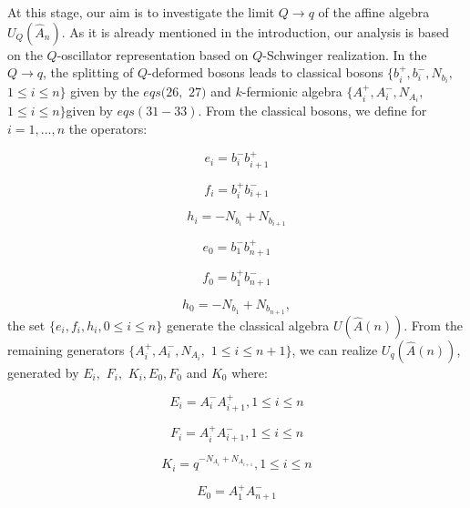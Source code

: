 \documentclass[a4paper,12pt,thmsa]{article}
\begin{document}
At this stage, our aim is to investigate the limit $Q\rightarrow q$ of the
affine algebra $U_Q(\hat A_n)$. As it is already mentioned in the
introduction, our analysis is based on the $Q$-oscillator representation
based on $Q$-Schwinger realization. In the $Q\rightarrow q$, the splitting
of $Q$-deformed bosons leads to classical bosons $\{b_i^{+},b_i^{-},N_{b_i},$
$1\leq i\leq n\}$ given by the $eqs(26,$ $27)$ and $k$-fermionic algebra $%
\{A_i^{+},A_i^{-},N_{A_i},$ $1\leq i\leq n\}$given by $eqs(31-33)$. From the
classical bosons, we define for $i=1,...,n$ the operators:

\begin{equation}
e_i=b_i^{-}b_{i+1}^{+}
\end{equation}

\begin{equation}
f_i=b_i^{+}b_{i+1}^{-}
\end{equation}

\begin{equation}
h_i=-N_{b_i}+N_{b_{i+1}}
\end{equation}

\begin{equation}
e_0=b_1^{-}b_{n+1}^{+}
\end{equation}

\begin{equation}
f_0=b_1^{+}b_{n+1}^{-}
\end{equation}

\begin{equation}
h_0=-N_{b_1}+N_{b_{n+1}},
\end{equation}
the set $\{e_i,f_i,h_i,0\leq i\leq n\}$ generate the classical algebra $%
U(\hat A(n)).$ From the remaining generators $\{A_i^{+},A_i^{-},N_{A_i},$ $%
1\leq i\leq n+1\}$, we can realize $U_q(\hat A(n))$, generated by $E_i,$ $%
F_i,$ $K_i,E_0,F_0$ and $K_0$ where:

\begin{equation}
E_i=A_i^{-}A_{i+1}^{+},1\leq i\leq n
\end{equation}

\begin{equation}
F_i=A_i^{+}A_{i+1}^{-},1\leq i\leq n
\end{equation}

\begin{equation}
K_i=q^{-N_{A_i}+N_{A_{i+1}}},1\leq i\leq n
\end{equation}

\begin{equation}
E_{0}=A_{1}^{+}A_{n+1}^{-}
\end{equation}
\end{document}
